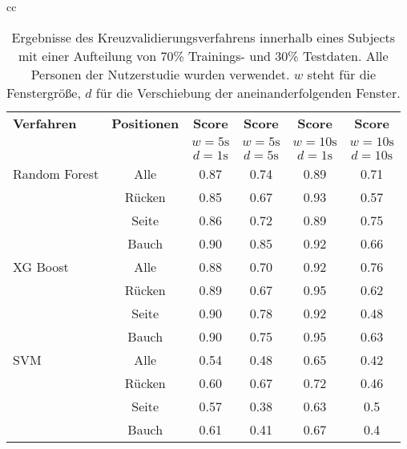 \begin{table}[H]
  \begin{tabular}{cc}
    \begin{minipage}{1\textwidth}
      \begin{center}
          \begin{tabular}{ | l | c | c | c | c | c | }
            \hline
            \textbf{Verfahren} & \textbf{Positionen} & \textbf{Score} & \textbf{Score} & \textbf{Score} & \textbf{Score} \\ 
            & & \textbf{$w=5\si{\s}$} & \textbf{$w=5\si{\s}$} & \textbf{$w=10\si{\s}$} & \textbf{$w=10\si{\s}$} \\
            & & \textbf{$d=1\si{\s}$} & \textbf{$d=5\si{\s}$} & \textbf{$d=1\si{\s}$} & \textbf{$d=10\si{\s}$} \\ \hline
            Random Forest & Alle &  0.87 & 0.74 & 0.89 & 0.71 \\ 
             & Rücken & 0.85 & 0.67 & 0.93 & 0.57 \\
             & Seite  & 0.86 & 0.72 & 0.89 & 0.75 \\
             & Bauch  & 0.90 & 0.85 & 0.92 & 0.66 \\ \hline
            XG Boost  & Alle & 0.88 & 0.70 & 0.92 & 0.76 \\ 
             & Rücken & 0.89 & 0.67 & 0.95 & 0.62 \\
             & Seite  & 0.90 & 0.78 & 0.92 & 0.48 \\
             & Bauch  & 0.90 & 0.75 & 0.95 & 0.63 \\ \hline
            SVM & Alle& 0.54 & 0.48 & 0.65 & 0.42 \\ 
             & Rücken & 0.60 & 0.67 & 0.72 & 0.46 \\
             & Seite  & 0.57 & 0.38 & 0.63 & 0.5 \\
             & Bauch  & 0.61 & 0.41 & 0.67 & 0.4 \\
            \hline
          \end{tabular}
      \end{center}
    \end{minipage}
  \end{tabular}

  \caption{Ergebnisse des Kreuzvalidierungsverfahrens innerhalb eines Subjects mit einer Aufteilung von 70\% Trainings- und 30\% Testdaten. Alle Personen der Nutzerstudie wurden verwendet. $w$ steht für die Fenstergröße, $d$ für die Verschiebung der aneinanderfolgenden Fenster.}
  \label{evaluation:within_subject_results}
\end{table}

